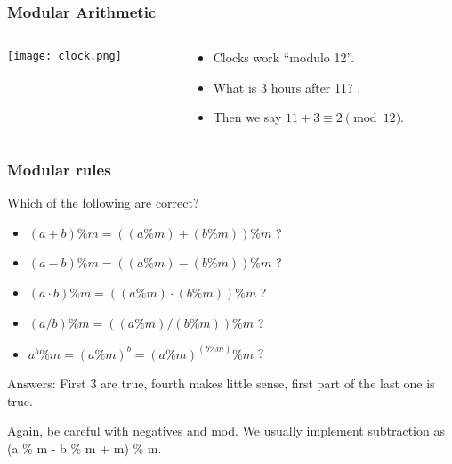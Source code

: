 \documentclass[t, handout]{beamer}
\begin{document}
\begin{frame}
    \frametitle{Modular Arithmetic}
    \begin{columns}
        \begin{column}{0.5\textwidth}
            \begin{center}
             \texttt{[image: clock.png]}
             \end{center}
        \end{column}
        
        \begin{column}{0.5\textwidth}
        \begin{itemize}
            \item Clocks work ``modulo 12''.
            
            \pause
            
            \item What is 3 hours after 11? .
            
            \pause
            
            \item Then we say $11 + 3 \equiv 2 \pmod{12}$.

        \end{itemize}

        \end{column}
    \end{columns}
\end{frame}

\begin{frame}

    \frametitle{Modular rules}
    
    Which of the following are correct?
    \begin{itemize}
        \item $(a + b) \% m = ((a \% m) + (b \% m)) \% m$ ?
        \pause
        \item $(a - b) \% m = ((a \%{m}) - (b \%{m})) \% m$ ?
        \pause
        \item $(a \cdot b) \%{m} = ((a \%{m}) \cdot (b \%{m})) \% m$ ?
        \pause
        \item $(a / b) \%{m} = ((a \%{m}) / (b \%{m})) \% m$ ?
        \pause
        \item $a^b \%{m} = (a \%{m})^b = (a \%{m})^{(b \%{m})} \% m$ ?
    \end{itemize}
    
    \pause
    Answers: First 3 are true, fourth makes little sense, first part of the last one is true.
    
    \pause
    Again, be careful with negatives and mod. We usually implement subtraction as (a \% m - b \% m + m) \% m. 
\end{frame}
\end{document}
